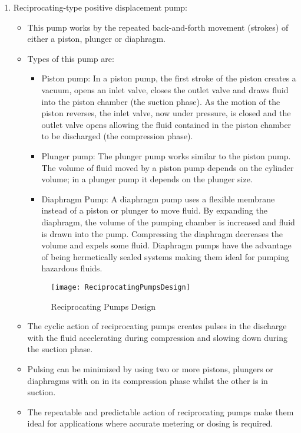 \begin{itemize}
\begin{enumerate}
\item Reciprocating-type positive displacement pump: 
\begin{itemize}
\item This pump works by the repeated back-and-forth movement (strokes) of either a piston, plunger or diaphragm. 
\item Types of this pump are:
\begin{itemize}
\item Piston pump:  In a piston pump, the first stroke of the piston creates a vacuum, opens an inlet valve, closes the outlet valve and draws fluid into the piston chamber (the suction phase). As the motion of the piston reverses, the inlet valve, now under pressure, is closed and the outlet valve opens allowing the fluid contained in the piston chamber to be discharged (the compression phase). 
\item Plunger pump:  The plunger pump works similar to the piston pump.  The volume of fluid moved by a piston pump depends on the cylinder volume; in a plunger pump it depends on the plunger size. 
\item Diaphragm Pump: A diaphragm pump uses a flexible membrane instead of a piston or plunger to move fluid. By expanding the diaphragm, the volume of the pumping chamber is increased and fluid is drawn into the pump. Compressing the diaphragm decreases the volume and expels some fluid. Diaphragm pumps have the advantage of being hermetically sealed systems making them ideal for pumping hazardous fluids.
\end{itemize}
\begin{figure}[h!]
\begin{center}
\texttt{[image: ReciprocatingPumpsDesign]}
\caption{Reciprocating Pumps Design}
\end{center}
\end{figure}
%

\item The cyclic action of reciprocating pumps creates pulses in the discharge with the fluid accelerating during compression and slowing down during the suction phase.
\item Pulsing can be minimized by using two or more pistons, plungers or diaphragms with on in its compression phase whilst the other is in suction.
\item The repeatable and predictable action of reciprocating pumps make them ideal for applications where accurate metering or dosing is required.
\end{itemize}
\end{enumerate}
\end{itemize}


